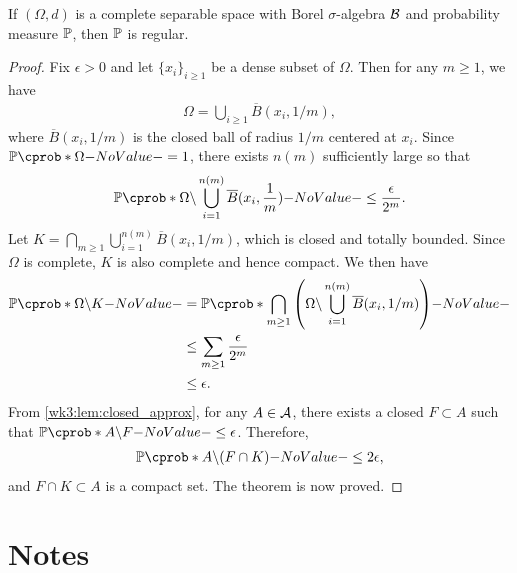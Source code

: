 \documentclass[12pt]{article}
\begin{document}
\begin{Theorem}[Ulam]\label{wk3:thm:Ulam}
If $(\Omega, d)$ is a complete separable space with Borel $\sigma$-algebra $\mathcal{B}$ and probability measure $\P$, then $\P$ is regular.
\end{Theorem}
\begin{proof}
Fix $\epsilon >0$ and let $\{x_i\}_{i\geq 1}$ be a dense subset of $\Omega$. Then for any $m\geq 1$, we have
\begin{align*}
\Omega = \bigcup_{i\geq 1} \overline{B}(x_i,1/m),
\end{align*}
where $\overline{B}(x_i,1/m)$ is the closed ball of radius $1/m$ centered at $x_i$. Since $\P(\Omega)=1$, there exists $n(m)$ sufficiently large so that 
\begin{align*}
\P(\Omega\backslash\bigcup_{i=1}^{n(m)} \overline{B}(x_i,\ofrac{m})) \leq \frac{\epsilon}{2^m}.
\end{align*}
Let $K = \displaystyle\bigcap_{m\geq 1}\bigcup_{i=1}^{n(m)} \overline{B}(x_i,1/m)$, which is closed and totally bounded. Since $\Omega$ is complete, $K$ is also complete and hence compact. We then have
\begin{align*}
\P(\Omega\backslash K) 
&= \P(\bigcap_{m\geq 1} \left(\Omega\backslash\bigcup_{i=1}^{n(m)} \overline{B}(x_i,1/m)\right))\\
&\leq \sum_{m\geq 1} \frac{\epsilon}{2^m}\\
&\leq \epsilon.
\end{align*}
From \cref{wk3:lem:closed_approx}, for any $A\in\mathcal{A}$, there exists a closed $F\subset A$ such that $\P(A\backslash F) \leq \epsilon$. Therefore, 
\begin{align*}
\P(A\backslash(F\cap K)) \leq 2\epsilon,
\end{align*}
and $F\cap K \subset A$ is a compact set. The theorem is now proved. 
\end{proof}


\section{Notes}
\end{document}
